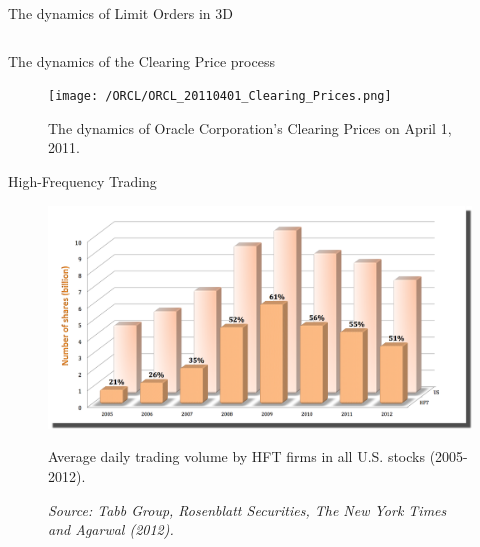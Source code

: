 \documentclass{beamer}
\begin{document}
\begin{frame}[shrink=40]{{\color{cyan}The dynamics of Limit Orders in 3D}}
\begin{columns}
\end{columns}

\end{frame}

\begin{frame}[shrink=30]{{\color{cyan}The dynamics of the Clearing Price process}}
\bigskip
\begin{figure}[H]
\begin{center}
	\texttt{[image: /ORCL/ORCL\_20110401\_Clearing\_Prices.png]}
\caption{The dynamics of Oracle Corporation's Clearing Prices on April 1, 2011.}
\label{fig:the_dynamics_ORCL_pi_20110401}
\end{center}
\end{figure} 
\end{frame}

\begin{frame}[shrink=30]{{\color{cyan}High-Frequency Trading}}
\bigskip
\begin{figure}[H]
\begin{center}
	\includegraphics[height=0.9\textheight]{HFT_US_20052012.png}
\caption{Average daily trading volume by HFT firms in all U.S. stocks (2005-2012).}
\vspace{-10pt}
\caption*{{\footnotesize \textit{Source: Tabb Group, Rosenblatt Securities, The New York Times and Agarwal (2012).}}}
\label{fig:HFT_volume}
\end{center}
\end{figure} 
\end{frame}

\end{document}

